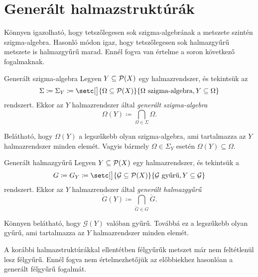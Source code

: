 \documentclass[
]{elteikthesis}[2024/04/26]
\begin{document}
	\section{Generált halmazstruktúrák}
	
	Könnyen igazolható, hogy tetszőlegesen sok szigma-algebrának a metszete szintén szigma-algebra.
	Hasonló módon igaz, hogy tetszőlegesen sok halmazgyűrű metszete is halmazgyűrű marad.
	Ennél fogva van értelme a soron következő fogalmaknak.
	
	\begin{definition}{Generált szigma-algebra}{}
		Legyen \( Y \subseteq \mathcal{P}( X ) \) egy halmazrendszer, és tekintsük az
		\[
		\Sigma \coloneq \Sigma_Y \coloneq 
		\setc[\big]{ \Omega \subseteq \powerset{X} }
		{ \Omega \text{ szigma-algebra}, Y \subseteq \Omega }
		\]
		rendszert. Ekkor az \( Y \) halmazrendszer által \emph{generált szigma-algebra}
		\[
		\Omega(Y) \coloneq \bigcap_{\Omega \in \Sigma} \Omega.
		\]
	\end{definition}
	
	\noindent 
	Belátható, hogy \( \Omega(Y) \) a legszűkebb olyan szigma-algebra,
	ami tartalmazza az \( Y \) halmazrendszer minden elemét.
	Vagyis bármely \( \Omega \in \Sigma_Y \) esetén \( \Omega(Y) \subseteq \Omega \).
	
	\begin{definition}{Generált halmazgyűrű}{}
		Legyen \( Y \subseteq \mathcal{P}( X ) \) egy halmazrendszer, és tekintsük a
		\[
			G \coloneq G_Y \coloneq 
			\setc[\big]{ \ring{G} \subseteq \powerset{X} }
			{ \ring{G} \text{ gyűrű}, Y \subseteq \ring{G} }
		\]
		rendszert. Ekkor az \( Y \) halmazrendszer által \emph{generált halmazgyűrű}
		\[
			\ring{G}(Y) \coloneq \bigcap_{\ring{G} \in G} \ring{G}.
		\]
	\end{definition}
	
	\noindent 
	Könnyen belátható, hogy \( \mathcal{G}(Y) \) valóban gyűrű. 
	Továbbá ez a legszűkebb olyan gyűrű, ami tartalmazza az \( Y \) halmazrendszer minden elemét.
	
	\newpage
	\noindent
	A korábbi halmazstruktúrákkal ellentétben félgyűrűk metszet már nem feltétlenül lesz félgyűrű.
	Ennél fogva nem értelmezhetőjük az előbbiekhez hasonlóan a generált félgyűrű fogalmát.
	
\end{document}
